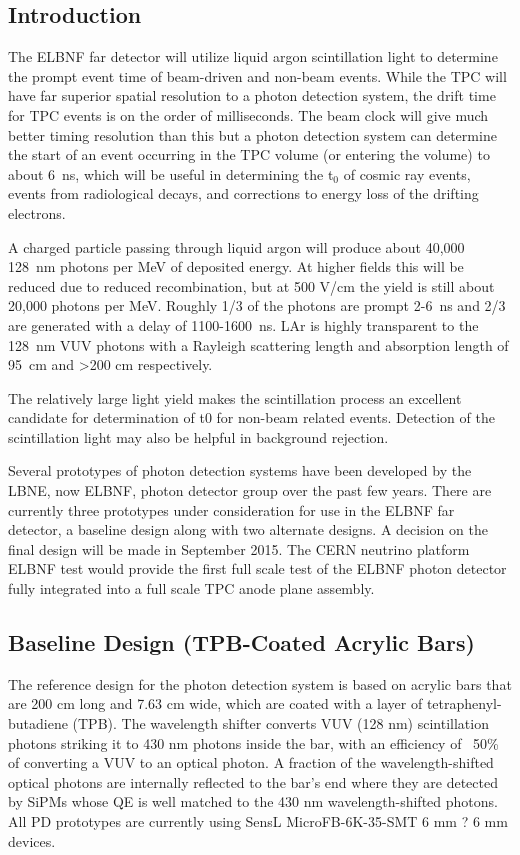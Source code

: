 

\subsection{Introduction}

The ELBNF far detector will utilize liquid argon scintillation light to determine the prompt event time of beam-driven and non-beam events. While the TPC will have far superior spatial resolution to a photon detection system, the drift time for TPC events is on the order of milliseconds. The beam clock will give much better timing resolution than this but a photon detection system can determine the start of an event occurring in the TPC volume (or entering the volume) to about 6~ns, which will be useful in determining the t$_0$ of cosmic ray events, events from radiological decays, and corrections to energy loss of the drifting electrons. 

A charged particle passing through liquid argon will produce about 40,000 128~nm photons per MeV of deposited energy. At higher fields this will be reduced due to reduced recombination, but at 500 V/cm the yield is still about 20,000 photons per MeV. Roughly 1/3 of the photons are prompt 2-6~ns and 2/3 are generated with a delay of 1100-1600~ns. LAr is highly transparent to the 128~nm VUV photons with a Rayleigh scattering length and absorption length of 95~cm and >200 cm respectively. 

The relatively large light yield makes the scintillation process an excellent candidate for determination of t0 for non-beam related events. Detection of the scintillation light may also be helpful in background rejection.

Several prototypes of photon detection systems have been developed by the LBNE, now ELBNF, photon detector group over the past few years. There are currently three prototypes under consideration for use in the ELBNF far detector, a baseline design along with two alternate designs. A decision on the final design will be made in September 2015. The CERN neutrino platform ELBNF test would provide the first full scale test of the ELBNF photon detector fully integrated into a full scale TPC anode plane assembly. 

\subsection{Baseline Design (TPB-Coated Acrylic Bars)}

The reference design for the photon detection system is based on acrylic bars that are 200 cm long and 7.63 cm wide, which are coated with a layer of tetraphenyl-butadiene (TPB). The wavelength shifter converts VUV (128 nm) scintillation photons striking it to 430 nm photons inside the bar, with an efficiency of ~50\% of converting a VUV to an optical photon.  A fraction of the wavelength-shifted optical photons are internally reflected to the bar's end where they are detected by SiPMs whose QE is well matched to the 430 nm wavelength-shifted photons. All PD prototypes are currently using SensL MicroFB-6K-35-SMT 6 mm ? 6 mm devices. 

